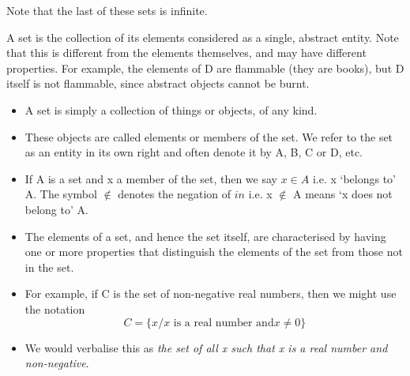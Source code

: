 \documentclass[11pt,a4paper,titlepage,oneside,openany]{article}
\numberwithin{equation}{section}
\numberwithin{algorithm}{section}
\numberwithin{figure}{section}
\numberwithin{table}{section}
\begin{document}
	Note that the last of these sets is infinite.

	
	A set is the collection of its elements considered as a single, abstract entity. Note that this is different from the elements themselves, and may have different properties. For example, the elements of D are flammable (they are books), but D itself is not flammable, since abstract objects cannot be burnt.

\begin{itemize}
\item A set is simply a collection of things or objects, of any kind. 
\item These objects
are called elements or members of the set. We refer to the set as an
entity in its own right and often denote it by A, B, C or D, etc.
\item 
If A is a set and x a member of the set, then we say $x \in A$ i.e. x ‘belongs to’
A. The symbol $\notin$ denotes the negation of $in$  i.e. x $\notin$ A means ‘x does not
belong to’ A.
\end{itemize}

\begin{itemize}
\item The elements of a set, and hence the set itself, are characterised by having
one or more properties that distinguish the elements of the set from those
not in the set. 
\item For example, if C is the set of non-negative real numbers, then we
might use the notation
\[C = \{x / x \mbox{ is a real number and} x \neq 0\}\]
\item We would verbalise this as \textit{the set of all x such that x is a real number and non-negative}.
\end{itemize}
\end{document}
